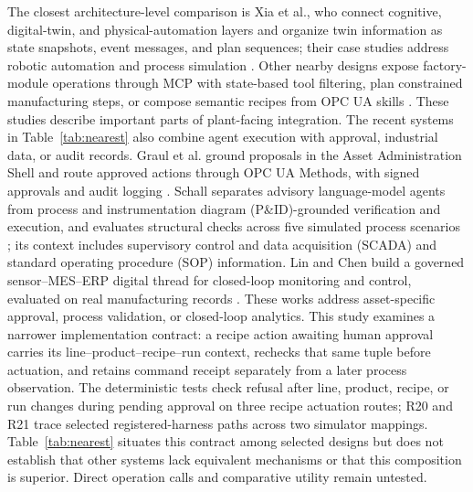 The closest architecture-level comparison is Xia et al., who connect cognitive,
digital-twin, and physical-automation layers and organize twin information as
state snapshots, event messages, and plan sequences; their case studies
address robotic automation and process simulation
\cite{xia2025architecture}. Other nearby designs expose factory-module
operations through MCP with state-based tool filtering, plan constrained
manufacturing steps, or compose semantic recipes from OPC UA skills
\cite{koehle2026llmdriven,silva2025mcpmanufacturing,koehle2025semanticrecipes}.
These studies describe important parts of plant-facing integration. The
recent systems in Table~\ref{tab:nearest} also combine agent execution with
approval, industrial data, or audit records. Graul et al. ground proposals in
the Asset Administration Shell and route approved actions through OPC UA
Methods, with signed approvals and audit logging
\cite{graul2026aas}. Schall separates advisory language-model agents from
process and instrumentation diagram (P\&ID)-grounded verification and
execution, and evaluates structural checks across five simulated process
scenarios \cite{schall2026safe}; its context includes supervisory control and
data acquisition (SCADA) and standard operating procedure (SOP) information.
Lin and Chen build a governed sensor--MES--ERP digital thread for closed-loop
monitoring and control, evaluated on real manufacturing
records \cite{lin2026agentic}. These works address asset-specific approval,
process validation, or closed-loop analytics. This study examines a narrower
implementation contract: a recipe action awaiting human approval carries its
line--product--recipe--run context, rechecks that same tuple before actuation,
and retains command receipt separately from a later process observation. The
deterministic tests check refusal after line, product, recipe, or run changes
during pending approval on three recipe actuation routes; R20 and R21 trace
selected registered-harness paths across two simulator mappings.
Table~\ref{tab:nearest} situates this contract among selected designs but does
not establish that other systems lack equivalent mechanisms or that this
composition is superior. Direct operation calls and comparative utility
remain untested.
